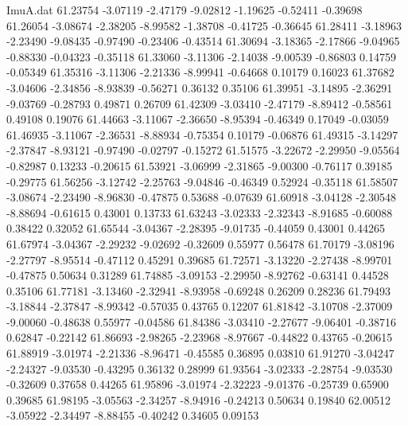 \begin{filecontents}{ImuA.dat}
  61.23754   -3.07119   -2.47179   -9.02812   -1.19625   -0.52411   -0.39698
  61.26054   -3.08674   -2.38205   -8.99582   -1.38708   -0.41725   -0.36645
  61.28411   -3.18963   -2.23490   -9.08435   -0.97490   -0.23406   -0.43514
  61.30694   -3.18365   -2.17866   -9.04965   -0.88330   -0.04323   -0.35118
  61.33060   -3.11306   -2.14038   -9.00539   -0.86803    0.14759   -0.05349
  61.35316   -3.11306   -2.21336   -8.99941   -0.64668    0.10179    0.16023
  61.37682   -3.04606   -2.34856   -8.93839   -0.56271    0.36132    0.35106
  61.39951   -3.14895   -2.36291   -9.03769   -0.28793    0.49871    0.26709
  61.42309   -3.03410   -2.47179   -8.89412   -0.58561    0.49108    0.19076
  61.44663   -3.11067   -2.36650   -8.95394   -0.46349    0.17049   -0.03059
  61.46935   -3.11067   -2.36531   -8.88934   -0.75354    0.10179   -0.06876
  61.49315   -3.14297   -2.37847   -8.93121   -0.97490   -0.02797   -0.15272
  61.51575   -3.22672   -2.29950   -9.05564   -0.82987    0.13233   -0.20615
  61.53921   -3.06999   -2.31865   -9.00300   -0.76117    0.39185   -0.29775
  61.56256   -3.12742   -2.25763   -9.04846   -0.46349    0.52924   -0.35118
  61.58507   -3.08674   -2.23490   -8.96830   -0.47875    0.53688   -0.07639
  61.60918   -3.04128   -2.30548   -8.88694   -0.61615    0.43001    0.13733
  61.63243   -3.02333   -2.32343   -8.91685   -0.60088    0.38422    0.32052
  61.65544   -3.04367   -2.28395   -9.01735   -0.44059    0.43001    0.44265
  61.67974   -3.04367   -2.29232   -9.02692   -0.32609    0.55977    0.56478
  61.70179   -3.08196   -2.27797   -8.95514   -0.47112    0.45291    0.39685
  61.72571   -3.13220   -2.27438   -8.99701   -0.47875    0.50634    0.31289
  61.74885   -3.09153   -2.29950   -8.92762   -0.63141    0.44528    0.35106
  61.77181   -3.13460   -2.32941   -8.93958   -0.69248    0.26209    0.28236
  61.79493   -3.18844   -2.37847   -8.99342   -0.57035    0.43765    0.12207
  61.81842   -3.10708   -2.37009   -9.00060   -0.48638    0.55977   -0.04586
  61.84386   -3.03410   -2.27677   -9.06401   -0.38716    0.62847   -0.22142
  61.86693   -2.98265   -2.23968   -8.97667   -0.44822    0.43765   -0.20615
  61.88919   -3.01974   -2.21336   -8.96471   -0.45585    0.36895    0.03810
  61.91270   -3.04247   -2.24327   -9.03530   -0.43295    0.36132    0.28999
  61.93564   -3.02333   -2.28754   -9.03530   -0.32609    0.37658    0.44265
  61.95896   -3.01974   -2.32223   -9.01376   -0.25739    0.65900    0.39685
  61.98195   -3.05563   -2.34257   -8.94916   -0.24213    0.50634    0.19840
  62.00512   -3.05922   -2.34497   -8.88455   -0.40242    0.34605    0.09153

\end{filecontents}

